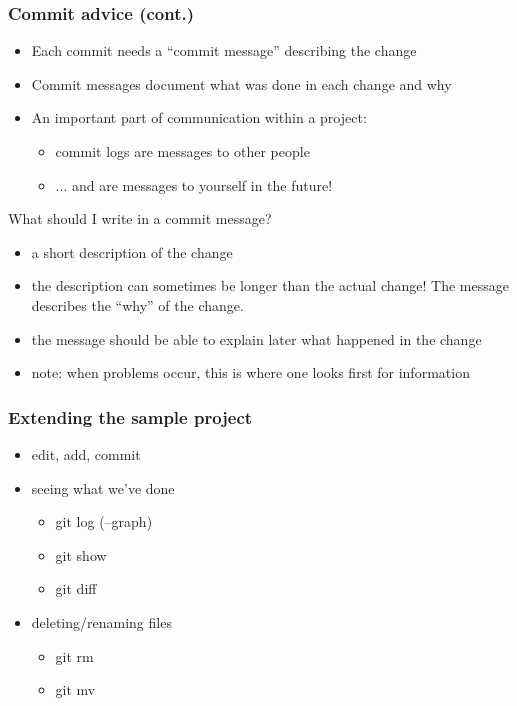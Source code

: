 \documentclass{git_course}
\begin{document}
\begin{frame}
\frametitle{Commit advice (cont.)}

\begin{itemize}
    \item Each commit needs a “commit message” describing the
    change
    \item Commit messages document what was done in each
    change and why
    \item An important part of communication within a project:
    \begin{itemize}
        \item commit logs are messages to other people
        \item ... and are messages to yourself in the future!
    \end{itemize}
\end{itemize}

What should I write in a commit message?
\begin{itemize}
    \item a short description of the change
    \item the description can sometimes be longer than the actual
    change! The message describes the “why” of the change.
    \item the message should be able to explain later what
    happened in the change
    \item note: when problems occur, this is where one looks ﬁrst for
        information
\end{itemize}

\end{frame}

\begin{frame}
\frametitle{Extending the sample project}
\begin{itemize}
    \item edit, add, commit
    \item seeing what we've done
    \begin{itemize}
        \item git log (--graph)
        \item git show
        \item git diff
    \end{itemize}
    \item deleting/renaming files
    \begin{itemize}
        \item git rm
        \item git mv
    \end{itemize}
\end{itemize}
\end{frame}
\end{document}
